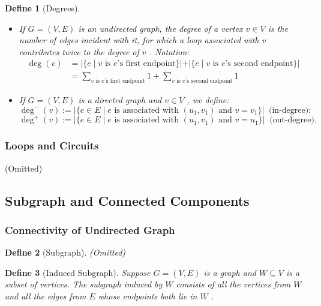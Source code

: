 \documentclass{ctexart}
\newcommand{\。}{．} %
\newenvironment{kuang3}{
    \begin{tcolorbox}[enhanced, breakable, colback=hlan!5!white, boxrule=0pt, frame hidden,
        borderline south={0.5mm}{0.1mm}{hlan}]
    }
    {\end{tcolorbox}}
\newenvironment{lvse}{
    \begin{tcolorbox}[enhanced, breakable, colback=qlv, boxrule=0pt, frame hidden,
        borderline west={0.7mm}{0.1mm}{slv}]
    }
    {\end{tcolorbox}}
\theoremstyle{t} %
\newtheorem{dyhj}{\color{slv} Define}[subsection] %
\newenvironment{dy}{\begin{lvse}\begin{dyhj}}{\end{dyhj}\end{lvse}}
\begin{document}
\begin{dy}[Degrees]
    \begin{itemize}
        \item If  $ G = (V, E) $  is an undirected graph, the degree of a vertex  $ v \in V $  is the number of edges incident with it, for which a loop associated with  $ v $  contributes twice to the degree of  $ v $ . Notation: 
        \begin{align*}
            \deg(v) &= \left|\{e \mid v \text{ is } e\text{'s first endpoint}\}| + |\{e \mid v \text{ is } e\text{'s second endpoint}\}\right| \\
            &= \sum_{v \text{ is } e\text{'s first endpoint}} 1 + \sum_{v \text{ is } e\text{'s second endpoint}} 1 
        \end{align*} 
        \item If  $ G = (V, E) $  is a directed graph and  $ v \in V $ , we define:
        $$ \deg^{-}(v) := \left|\{e \in E \mid e \text{ is associated with } (u_1, v_1) \text{ and } v = v_1\}\right|\ \text{ (in-degree)}; $$ 
        $$ \deg^{+}(v) := \left|\{e \in E \mid e \text{ is associated with } (u_1, v_1) \text{ and } v = u_1\}\right|\ \text{ (out-degree)}. $$ 
    \end{itemize}
\end{dy}

\subsubsection{Loops and Circuits}

(Omitted)

\begin{kuang3}
    \subsection{Subgraph and Connected Components}
\end{kuang3}

\subsubsection{Connectivity of Undirected Graph}

\begin{dy}[Subgraph]
    (Omitted)
\end{dy}

\begin{dy}[Induced Subgraph]
    Suppose  $ G = (V, E) $  is a graph and  $ W \subseteq V $  is a subset of vertices. The subgraph induced by  $ W $  consists of all the vertices from  $ W $  and all the edges from  $ E $  whose endpoints both lie in  $ W $ .
\end{dy}
\end{document}
